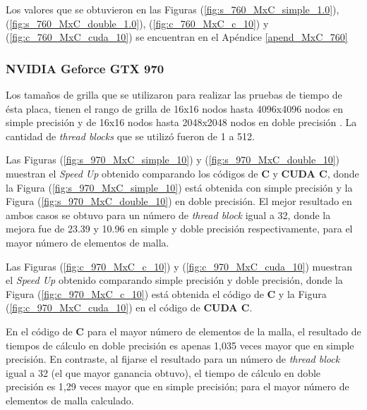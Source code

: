 Los valores que se obtuvieron en las Figuras (\ref{fig:s_760_MxC_simple_1.0}), (\ref{fig:s_760_MxC_double_1.0}), (\ref{fig:c_760_MxC_c_10}) y (\ref{fig:c_760_MxC_cuda_10}) se encuentran en el Apéndice \ref{apend_MxC_760}

\newpage

\subsubsection{NVIDIA Geforce GTX 970}

Los tamaños de grilla que se utilizaron para realizar las pruebas de tiempo de ésta placa, tienen el rango de grilla de 16x16 nodos hasta 4096x4096 nodos en simple precisión y de 16x16 nodos hasta 2048x2048 nodos en doble precisión . La cantidad de \textit{thread blocks} que se utilizó fueron de 1 a 512.

Las Figuras (\ref{fig:s_970_MxC_simple_10}) y (\ref{fig:s_970_MxC_double_10}) muestran el \textit{Speed Up} obtenido comparando los códigos de \textbf{C} y \textbf{CUDA C}, donde la Figura (\ref{fig:s_970_MxC_simple_10}) está obtenida con simple precisión y la Figura (\ref{fig:s_970_MxC_double_10}) en doble precisión. El mejor resultado en ambos casos se obtuvo para un número de \textit{thread block} igual a 32, donde la mejora fue de 23.39 y 10.96 en simple y doble precisión respectivamente, para el mayor número de elementos de malla.

Las Figuras (\ref{fig:c_970_MxC_c_10}) y (\ref{fig:c_970_MxC_cuda_10}) muestran el \textit{Speed Up} obtenido comparando simple precisión y doble precisión, donde la Figura (\ref{fig:c_970_MxC_c_10}) está obtenida el código de \textbf{C} y la Figura (\ref{fig:c_970_MxC_cuda_10}) en el código de \textbf{CUDA C}.

En el código de \textbf{C} para el mayor número de elementos de la malla, el resultado de tiempos de cálculo en doble precisión es apenas 1,035 veces mayor que en  simple precisión. En contraste, al fijarse el resultado para un número de \textit{thread block} igual a 32 (el que mayor ganancia obtuvo), el tiempo de cálculo en doble precisión es 1,29 veces mayor que en simple precisión; para el mayor número de elementos de malla calculado.

